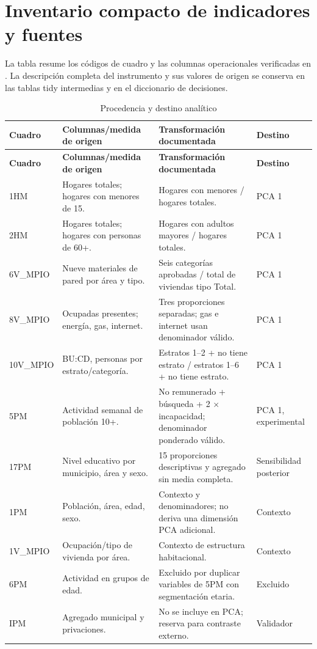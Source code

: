 \section{Inventario compacto de indicadores y fuentes}
\label{anexo:indicadores}

La tabla resume los códigos de cuadro y las columnas operacionales verificadas en . La descripción completa del instrumento y sus valores de origen se conserva en las tablas tidy intermedias y en el diccionario de decisiones.

\small
\begin{longtable}{@{}p{}p{}p{}p{}@{}}
\caption{Procedencia y destino analítico}\label{tab:procedencia_indicadores}\\
\toprule
\textbf{Cuadro} & \textbf{Columnas/medida de origen} & \textbf{Transformación documentada} & \textbf{Destino}\\
\midrule
\endfirsthead
\toprule
\textbf{Cuadro} & \textbf{Columnas/medida de origen} & \textbf{Transformación documentada} & \textbf{Destino}\\
\midrule
\endhead
1HM & Hogares totales; hogares con menores de 15. & Hogares con menores / hogares totales. & PCA 1 \\
2HM & Hogares totales; hogares con personas de 60+. & Hogares con adultos mayores / hogares totales. & PCA 1 \\
6V\_MPIO & Nueve materiales de pared por área y tipo. & Seis categorías aprobadas / total de viviendas tipo Total. & PCA 1 \\
8V\_MPIO & Ocupadas presentes; energía, gas, internet. & Tres proporciones separadas; gas e internet usan denominador válido. & PCA 1 \\
10V\_MPIO & BU:CD, personas por estrato/categoría. & Estratos 1--2 + no tiene estrato / estratos 1--6 + no tiene estrato. & PCA 1 \\
5PM & Actividad semanal de población 10+. & No remunerado + búsqueda + 2 $\times$ incapacidad; denominador ponderado válido. & PCA 1, experimental \\
17PM & Nivel educativo por municipio, área y sexo. & 15 proporciones descriptivas y agregado sin media completa. & Sensibilidad posterior \\
1PM & Población, área, edad, sexo. & Contexto y denominadores; no deriva una dimensión PCA adicional. & Contexto \\
1V\_MPIO & Ocupación/tipo de vivienda por área. & Contexto de estructura habitacional. & Contexto \\
6PM & Actividad en grupos de edad. & Excluido por duplicar variables de 5PM con segmentación etaria. & Excluido \\
IPM & Agregado municipal y privaciones. & No se incluye en PCA; reserva para contraste externo. & Validador \\
\bottomrule
\end{longtable}
\normalsize
